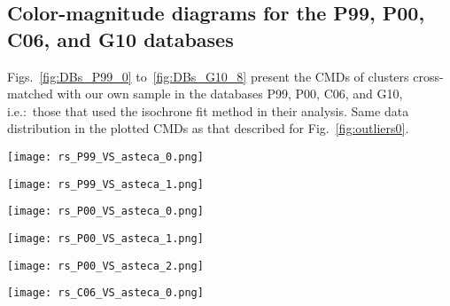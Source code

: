 \documentclass{aa}
\begin{document}
\begin{appendix}
\section{Color-magnitude diagrams for the P99, P00, C06, and G10 databases}
\label{apdx:databases}

Figs.~\ref{fig:DBs_P99_0} to~\ref{fig:DBs_G10_8} present the CMDs of clusters
cross-matched with our own sample in the databases P99, P00, C06, and G10,
i.e.:\ those that used the isochrone fit method in their analysis.
%
Same data distribution in the plotted CMDs as that described for
Fig.~\ref{fig:outliers0}.

\begin{figure*}
\texttt{[image: rs\_P99\_VS\_asteca\_0.png]}
\caption{CMDs for the P99 database.}
\label{fig:DBs_P99_0}
\end{figure*}
\clearpage

\begin{figure*}
\texttt{[image: rs\_P99\_VS\_asteca\_1.png]}
\caption{CMDs for the P99 database.}
\label{fig:DBs_P99_1}
\end{figure*}
\clearpage

\begin{figure*}
\texttt{[image: rs\_P00\_VS\_asteca\_0.png]}
\caption{CMDs for the P00 database.}
\label{fig:DBs_P00_0}
\end{figure*}
\clearpage

\begin{figure*}
\texttt{[image: rs\_P00\_VS\_asteca\_1.png]}
\caption{CMDs for the P00 database.}
\label{fig:DBs_P00_1}
\end{figure*}
\clearpage

\begin{figure*}
\texttt{[image: rs\_P00\_VS\_asteca\_2.png]}
\caption{CMDs for the P00 database.}
\label{fig:DBs_P00_2}
\end{figure*}
\clearpage

\begin{figure*}
\texttt{[image: rs\_C06\_VS\_asteca\_0.png]}
\caption{CMDs for the C06 database.}
\label{fig:DBs_C06_0}
\end{figure*}
\clearpage


\end{appendix}
\end{document}
